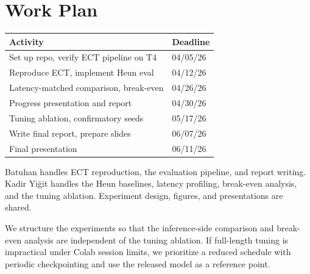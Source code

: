 \documentclass{article}
\begin{document}
\section{Work Plan}

\begin{tabular}{|l|l|}
\hline
\textbf{Activity} & \textbf{Deadline} \\
\hline
Set up repo, verify ECT pipeline on T4 & 04/05/26 \\
\hline
Reproduce ECT, implement Heun eval & 04/12/26 \\
\hline
Latency-matched comparison, break-even & 04/26/26 \\
\hline
Progress presentation and report & 04/30/26 \\
\hline
Tuning ablation, confirmatory seeds & 05/17/26 \\
\hline
Write final report, prepare slides & 06/07/26 \\
\hline
Final presentation & 06/11/26 \\
\hline
\end{tabular}

\vspace{0.3em}
Batuhan handles ECT reproduction, the evaluation pipeline, and report writing. Kadir Yi\u{g}it handles the Heun baselines, latency profiling, break-even analysis, and the tuning ablation. Experiment design, figures, and presentations are shared.

We structure the experiments so that the inference-side comparison and break-even analysis are independent of the tuning ablation. If full-length tuning is impractical under Colab session limits, we prioritize a reduced schedule with periodic checkpointing and use the released model as a reference point.



\end{document}
